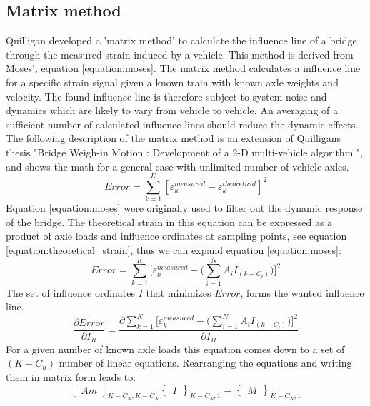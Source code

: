 \subsection{Matrix method}
Quilligan \cite{Quilligan} developed a 'matrix method' to calculate the influence line of a bridge through the measured strain induced by a vehicle. This method is derived from Moses', equation \ref{equation:moses}. The matrix method calculates a influence line for a specific strain signal given a known train with known axle weights and velocity. The found influence line is therefore subject to system noise and dynamics which are likely to vary from vehicle to vehicle. An averaging of a sufficient number of calculated influence lines should reduce the dynamic effects. The following description of the matrix method is an extension of Quilligans thesis "Bridge Weigh-in Motion : Development of a 2-D multi-vehicle algorithm \cite{Quilligan}", and shows the math for a general case with unlimited number of vehicle axles.
\begin{equation}
Error = \sum_{k = 1}^{K} [\varepsilon_{k}^{measured} - \varepsilon_{k}^{theoretical}]^2
\label{equation:moses}
\end{equation}
Equation \ref{equation:moses} were originally used to filter out the dynamic response of the bridge.
The theoretical strain in this equation can be expressed as a product of axle loads and influence ordinates at sampling points, see equation \ref{equation:theoretical_strain}, thus we can expand equation \ref{equation:moses}:
\begin{equation}
Error = \sum_{k = 1}^{K} \Big[\varepsilon_{k}^{measured} - \Big(\sum_{i = 1}^{N} A_i I_{(k-C_i)}\Big)\Big]^2
\label{equation:moses_expanded}
\end{equation}
The set of influence ordinates $I$ that minimizes $Error$, forms the wanted influence line.
\begin{equation}
\frac{\partial Error}{\partial I_R} = \frac{\partial \sum_{k = 1}^{K} \Big[\varepsilon_{k}^{measured} - \Big(\sum_{i = 1}^{N} A_i I_{(k-C_i)}\Big)\Big]^2}{\partial I_R}
\end{equation}
For a given number of known axle loads this equation comes down to a set of $(K - C_n)$ number of linear equations. Rearranging the equations and writing them in matrix form leads to:
\begin{equation}
\begin{bmatrix} Am \end{bmatrix}_{K-C_N, K-C_N} \begin{Bmatrix} I \end{Bmatrix}_{K-C_N, 1} = \begin{Bmatrix} M \end{Bmatrix}_{K-C_N, 1}
\label{equation:matrixForm}
\end{equation}
